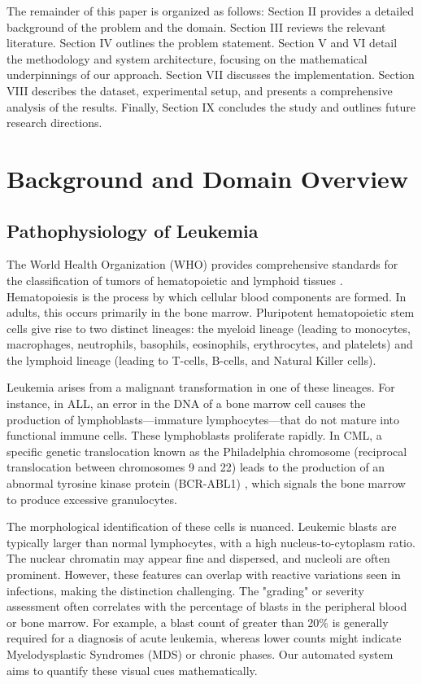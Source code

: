 \documentclass[journal]{IEEEtran}
\begin{document}
The remainder of this paper is organized as follows: Section II provides a detailed background of the problem and the domain. Section III reviews the relevant literature. Section IV outlines the problem statement. Section V and VI detail the methodology and system architecture, focusing on the mathematical underpinnings of our approach. Section VII discusses the implementation. Section VIII describes the dataset, experimental setup, and presents a comprehensive analysis of the results. Finally, Section IX concludes the study and outlines future research directions.

\section{Background and Domain Overview}

\subsection{Pathophysiology of Leukemia}
The World Health Organization (WHO) provides comprehensive standards for the classification of tumors of hematopoietic and lymphoid tissues \cite{r2, r3, r10}. Hematopoiesis is the process by which cellular blood components are formed. In adults, this occurs primarily in the bone marrow. Pluripotent hematopoietic stem cells give rise to two distinct lineages: the myeloid lineage (leading to monocytes, macrophages, neutrophils, basophils, eosinophils, erythrocytes, and platelets) and the lymphoid lineage (leading to T-cells, B-cells, and Natural Killer cells).

Leukemia arises from a malignant transformation in one of these lineages. For instance, in ALL, an error in the DNA of a bone marrow cell causes the production of lymphoblasts—immature lymphocytes—that do not mature into functional immune cells. These lymphoblasts proliferate rapidly. In CML, a specific genetic translocation known as the Philadelphia chromosome (reciprocal translocation between chromosomes 9 and 22) leads to the production of an abnormal tyrosine kinase protein (BCR-ABL1) \cite{r12}, which signals the bone marrow to produce excessive granulocytes.

The morphological identification of these cells is nuanced. Leukemic blasts are typically larger than normal lymphocytes, with a high nucleus-to-cytoplasm ratio. The nuclear chromatin may appear fine and dispersed, and nucleoli are often prominent. However, these features can overlap with reactive variations seen in infections, making the distinction challenging. The "grading" or severity assessment often correlates with the percentage of blasts in the peripheral blood or bone marrow. For example, a blast count of greater than 20\% is generally required for a diagnosis of acute leukemia, whereas lower counts might indicate Myelodysplastic Syndromes (MDS) or chronic phases. Our automated system aims to quantify these visual cues mathematically.
\end{document}
